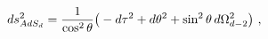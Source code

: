 \begin{equation}
ds^2_{AdS_d} = {1\over \cos^2\theta} \big( -d\tau^2 + 
  d\theta^2 +\sin^2\theta\, d\Omega_{d-2}^2\big)\ ,
\label{adsthree}
\end{equation}

